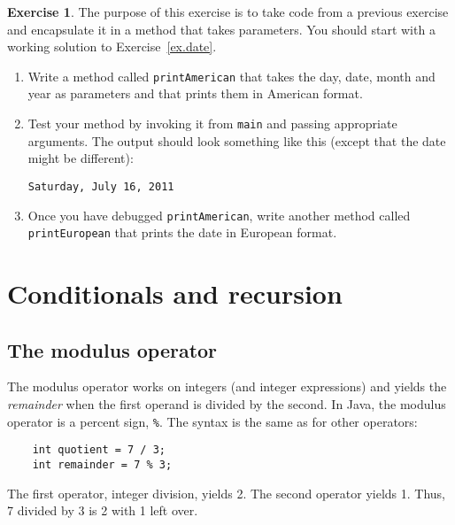 \documentclass[12pt]{book}
\theoremstyle{definition}
\newtheorem{excz}{Exercise}[chapter]
\newenvironment{exercise}{\bigskip\begin{excz}\mbox{}}{\end{excz}}
\begin{document}
\begin{exercise}

The purpose of this exercise is to take code from a previous exercise
and encapsulate it in a method that takes parameters.  You should
start with a working solution to Exercise~\ref{ex.date}.

\begin{enumerate}

\item Write a method called {\tt printAmerican}
that takes the day, date, month and year as parameters and that
prints them in American format.

\item Test your method by invoking it from {\tt main} and passing
appropriate arguments.  The output should look something like this
(except that the date might be different):
%
\begin{lstlisting}
Saturday, July 16, 2011
\end{lstlisting}
%
\item Once you have debugged {\tt printAmerican}, write another
method called {\tt printEuropean} that prints the date in
European format.

\end{enumerate}
\end{exercise}



\chapter{Conditionals and recursion}
\label{chap04}
\label{condrecursion}

\section{The modulus operator}

The modulus operator works on integers (and integer expressions)
and yields the {\em remainder} when the first operand is divided
by the second.  In Java, the modulus operator is a percent sign,
{\tt \%}.  The syntax is the same as for other operators:

\begin{lstlisting}
    int quotient = 7 / 3;
    int remainder = 7 % 3;
\end{lstlisting}
%
The first operator, integer division, yields 2.  The second
operator yields 1.  Thus, 7 divided by 3 is 2 with 1 left over.
\end{document}
